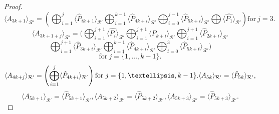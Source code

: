 \documentclass[10pt,a4paper]{amsart}
\begin{document}
\begin{proof}
       $$ \langle  A_{3k+1} \rangle_{\mathcal{R}'} =  \left( \bigoplus_{i=1}^{j} \langle \hat{P}_{ik+1} \rangle_{\mathcal{R}'} \bigoplus_{i=1}^{k-1} \langle \hat{P}_{4k+i} \rangle_{\mathcal{R}'} \bigoplus_{i=0}^{j-1} \langle \hat{P}_{5k+i} \rangle_{\mathcal{R}'} \bigoplus \langle \hat{P_{1}} \rangle_{\mathcal{R}'}  \right) \text{for} ~ j =3. $$ 
       $$ \langle  A_{3k+1+j} \rangle_{\mathcal{R}'} = ( \bigoplus_{i=1}^{j+1} \langle \hat{P_{i}} \rangle_{\mathcal{R}'} \bigoplus_{i=1}^{j+1} \langle \hat{P}_{k+i} \rangle_{\mathcal{R}'}  \bigoplus_{i=1}^{j+1} \langle \hat{P}_{2k+i} \rangle_{\mathcal{R}'} $$ $$\bigoplus_{i=1}^{j+1} \langle \hat{P}_{3k+i} \rangle_{\mathcal{R}'} \bigoplus_{i=1}^{k-1} \langle \hat{P}_{4k+i} \rangle_{\mathcal{R}'} \bigoplus_{t=0}^{3} \langle \hat{P}_{5k+t} \rangle_{\mathcal{R}'} )$$ $$ \text{for} ~ j = \{1,\dots,k-1\}. $$ 
       $$ \langle  A_{4k+j} \rangle_{\mathcal{R}'} = \left( \bigoplus_{i=1}^{j} \langle \hat{P}_{4k+i} \rangle_{\mathcal{R}'} \right) \text{for} ~ j = \{1,\dots,k-1\}.\langle  A_{5k} \rangle_{\mathcal{R}'} \\ = \langle \hat{P}_{5k} \rangle_{\mathcal{R}'}, $$  $$ \langle  A_{5k+1} \rangle_{\mathcal{R}'}= \langle \hat{P}_{5k+1} \rangle_{\mathcal{R}'} ,\langle  A_{5k+2} \rangle_{\mathcal{R}'} = \langle \hat{P}_{5k+2} \rangle_{\mathcal{R}'} ,\langle  A_{5k+3} \rangle_{\mathcal{R}'} =  \langle \hat{P}_{5k+3} \rangle_{\mathcal{R}'}.$$
    

\end{proof}
\end{document}
